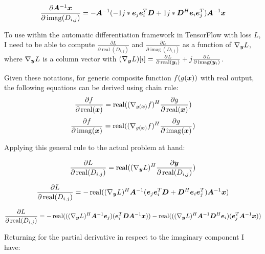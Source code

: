 \documentclass{article}
\begin{document}
\begin{equation}
\frac{\partial\bm{A}^{-1}\bm{x}}{\partial \operatorname{imag}(D_{i,j})} = -\bm{A}^{-1}(-1j*\bm{e}_j\bm{e}_i^T\bm{D} + 1j*\bm{D}^H\bm{e}_i\bm{e}_j^T)\bm{A}^{-1}\bm{x}
\end{equation}

To use within the automatic differentiation framework in TensorFlow with loss $L$, I need to be able to compute $\frac{\partial L}{\partial \operatorname{real}(D_{i,j})}$ and $\frac{\partial L}{\partial \operatorname{imag}(D_{i,j})}$ as a function of $\nabla_{\bm{y}} L$, where $\nabla_{\bm{y}} L$ is a column vector with $(\nabla_{\bm{y}} L)[i] = \frac{\partial L}{\partial \operatorname{real}(\bm{y}_i)} + j\frac{\partial L}{\partial \operatorname{imag}(\bm{y}_i)}$.

Given these notations, for generic composite function $f(g(\bm{x}))$ with real output, the following equations can be derived using chain rule:
\begin{equation}
\frac{\partial f}{\partial \operatorname{real}(\bm{x})} = \operatorname{real}((\nabla_{g(\bm{x})} f)^H \frac{\partial g}{\partial \operatorname{real}(\bm{x})})
\end{equation}
\begin{equation}
\frac{\partial f}{\partial \operatorname{imag}(\bm{x})} = \operatorname{real}((\nabla_{g(\bm{x})} f)^H \frac{\partial g}{\partial \operatorname{imag}(\bm{x})})
\end{equation}

Applying this general rule to the actual problem at hand:

\begin{equation}
\frac{\partial L}{\partial \operatorname{real}(D_{i,j})} = \operatorname{real}((\nabla_{\bm{y}} L)^H\frac{\partial \bm{y}}{\partial \operatorname{real}(D_{i,j})})
\end{equation}

\begin{equation}
\frac{\partial L}{\partial \operatorname{real}(D_{i,j})} = -\operatorname{real}((\nabla_{\bm{y}} L)^H\bm{A}^{-1}(\bm{e}_j\bm{e}_i^T\bm{D} + \bm{D}^H\bm{e}_i\bm{e}_j^T)\bm{A}^{-1}\bm{x})
\end{equation}

\begin{equation}
\frac{\partial L}{\partial \operatorname{real}(D_{i,j})} = -\operatorname{real}(((\nabla_{\bm{y}} L)^H\bm{A}^{-1}\bm{e}_j)(\bm{e}_i^T\bm{D}\bm{A}^{-1}\bm{x})) - \operatorname{real}(((\nabla_{\bm{y}} L)^H\bm{A}^{-1}\bm{D}^H\bm{e}_i)(\bm{e}_j^T\bm{A}^{-1}\bm{x}))
\end{equation}

Returning for the partial derivative in respect to the imaginary component I have:
\end{document}
